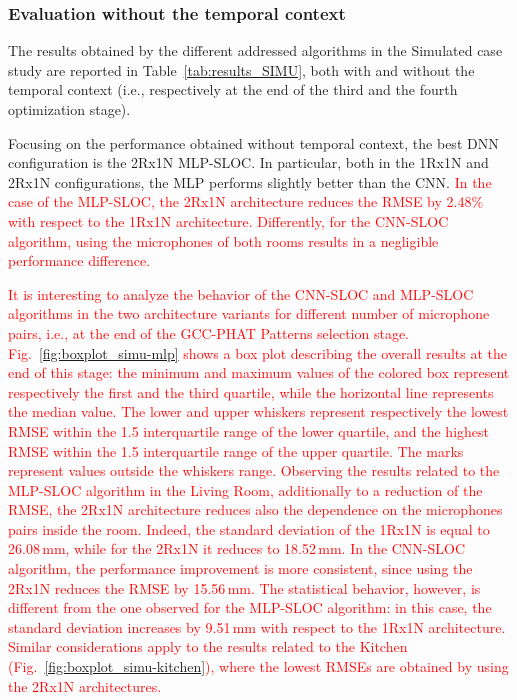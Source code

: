 \documentclass[review]{elsarticle}
\newcommand{\figref}[1]{Fig.~\ref{#1}}
\newcommand{\tableref}[1]{Table~\ref{#1}}
\begin{document}
\subsubsection{Evaluation without the temporal context}
The results obtained by the different addressed algorithms in the Simulated case study are reported in \tableref{tab:results_SIMU}, both with and without the temporal context (i.e., respectively at the end of the third and the fourth optimization stage).

Focusing on the performance obtained without temporal context, the best DNN configuration is the 2Rx1N MLP-SLOC. In particular, both in the 1Rx1N and  2Rx1N configurations, the MLP performs slightly better than the CNN. \textcolor{red}{ In the case of the MLP-SLOC, the 2Rx1N architecture reduces the RMSE by 2.48\%  with respect to the 1Rx1N architecture. Differently, for the CNN-SLOC algorithm, using the microphones of both rooms results in a negligible performance difference.}

\textcolor{red}{It is interesting to analyze the behavior of the CNN-SLOC and MLP-SLOC algorithms in the two architecture variants for different number of microphone pairs, i.e., at the end of the GCC-PHAT Patterns selection stage. \figref{fig:boxplot_simu-mlp} shows a box plot describing the overall results at the end of this stage: the minimum and maximum values of the colored box represent respectively the first and the third quartile, while the horizontal line represents the median value. The lower and upper whiskers represent respectively the lowest RMSE within the 1.5 interquartile range of the lower quartile, and the highest RMSE within the 1.5 interquartile range of the upper quartile. The marks represent values outside the whiskers range. %
Observing the results related to the MLP-SLOC algorithm in the Living Room, additionally to a reduction of the RMSE, the 2Rx1N architecture reduces also the dependence on the microphones pairs inside the room. Indeed, the standard deviation of the 1Rx1N is equal to 26.08\,mm, while for the 2Rx1N it reduces to 18.52\,mm. In the CNN-SLOC algorithm, the performance improvement is more consistent, since using the 2Rx1N reduces the RMSE by 15.56\,mm. The statistical behavior, however, is different from the one observed for the MLP-SLOC algorithm: in this case, the standard deviation increases by 9.51\,mm with respect to the 1Rx1N architecture. Similar considerations apply to the results related to the Kitchen (\figref{fig:boxplot_simu-kitchen}), where the lowest RMSEs are obtained by using the 2Rx1N architectures.}
\end{document}
